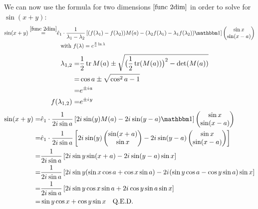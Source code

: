 \documentclass{article}
\renewcommand{\i}{{i\mkern1mu}}
\begin{document}
We can now use the formula for two dimensions $\eqref{func 2dim}$ in order to solve for $\sin(x+y)$:
\begin{align}
\sin(x+y) \overset{\eqref{func 2dim}}=& \hat e_1 \cdot \frac 1{\lambda_1 - \lambda_2} \left[(f(\lambda_1) - f(\lambda_2))M(a) - (\lambda_2 f(\lambda_1) - \lambda_1 f(\lambda_2)) \mathbbm 1\right] \begin{pmatrix} \sin x \\ \sin(x-a) \end{pmatrix} \nonumber\\
&\ \ \text{with}\ f(\lambda) = e^{\frac ya \ln\lambda}
\end{align}
\begin{align}
\lambda_{1,2} =& \frac 12\tr M(a) \pm \sqrt{\big(\frac 12\tr (M(a))\big)^2 - \det(M(a))}\nonumber\\
=& \cos a \pm \sqrt{\cos^2 a - 1}\nonumber\\
=& e^{\pm \i a}\\
f(\lambda_{1,2}) =& e^{\pm \i y}
\end{align}
\begin{align}
\sin(x+y) =& \hat e_1 \cdot \frac 1{2\i \sin a} \left[2\i \sin(y) M(a) - 2\i \sin(y - a) \mathbbm 1\right] \begin{pmatrix} \sin x \\ \sin(x-a) \end{pmatrix} \nonumber\\
=& \hat e_1 \cdot \frac 1{2\i \sin a} \left[2\i \sin(y)  \begin{pmatrix} \sin(x+a) \\ \sin x \end{pmatrix} - 2\i \sin(y - a) \begin{pmatrix} \sin x \\ \sin(x-a) \end{pmatrix} \right] \nonumber\\
=& \frac 1{2\i \sin a} \left[2\i \sin y \sin(x+a) - 2\i \sin(y - a) \sin x \right] \nonumber\\
=& \frac 1{2\i \sin a} \left[2\i \sin y (\sin x \cos a + \cos x \sin a) - 2\i (\sin y \cos a - \cos y \sin a) \sin x \right] \nonumber\\
=& \frac 1{2\i \sin a} \left[2\i \sin y \cos x \sin a + 2\i \cos y \sin a \sin x \right] \nonumber\\
=& \sin y \cos x + \cos y \sin x\ \ \ \text{Q.E.D.}
\end{align}
\end{document}
